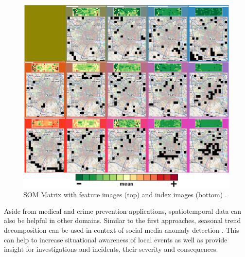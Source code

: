 \documentclass[electronic]{vgtc}             %
\begin{document}
\begin{figure}[tb]
	\centering
	\includegraphics[width=\columnwidth]{SOM_SiT}
	\caption{SOM Matrix with feature images (top) and index images (bottom) \cite{Andrienko:2010:Space}.
	}
	\label{fig:som}
\end{figure}

Aside from medical and crime prevention applications, spatiotemporal data can also be helpful in other domains. 
Similar to the first approaches, seasonal trend decomposition can be used in context of social media anomaly detection \cite{Chae:2012, Thom:2012}. 
This can help to increase situational awareness of local events as well as provide insight for investigations and incidents, their severity and consequences.
\end{document}
